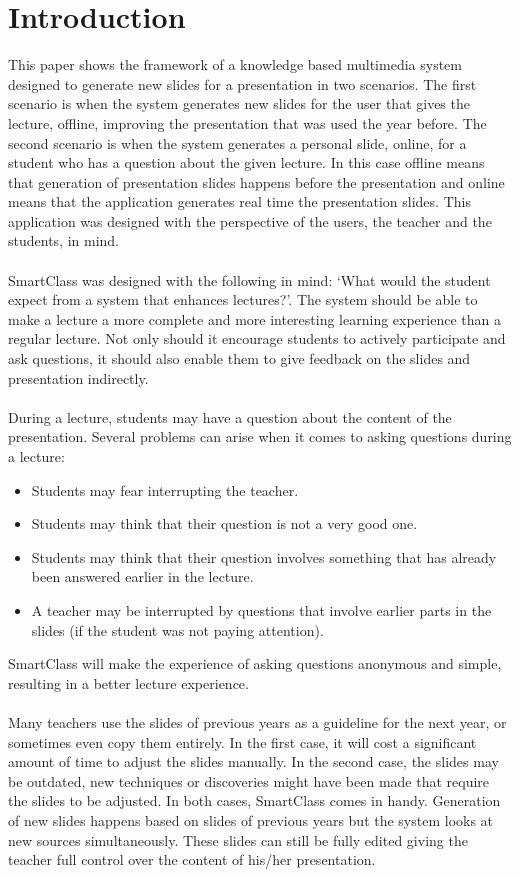 \documentclass[11pt]{article}
\begin{document}
\section{Introduction}
This paper shows the framework of a knowledge based multimedia system designed to generate new slides for a presentation in two scenarios. The first scenario is when the system generates new slides for the user that gives the lecture, offline, improving the presentation that was used the year before. The second scenario is when the system generates a personal slide, online, for a student who has a question about the given lecture. In this case offline means that generation of presentation slides happens before the presentation and online means that the application generates real time the presentation slides. This application was designed with the perspective of the users, the teacher and the students, in mind.\\\\
SmartClass was designed with the following in mind: `What would the student expect from a system that enhances lectures?'. The system should be able to make a lecture a more complete and more interesting learning experience than a regular lecture. Not only should it encourage students to actively participate and ask questions, it should also enable them to give feedback on the slides and presentation indirectly. \\\\
During a lecture, students may have a question about the content of the presentation. Several problems can arise when it comes to asking questions during a lecture:
\begin{itemize}
\item Students may fear interrupting the teacher.
\item Students may think that their question is not a very good one.
\item Students may think that their question involves something that has already been answered earlier in the lecture. 
\item A teacher may be interrupted by questions that involve earlier parts in the slides (if the student was not paying attention).
\end{itemize}

SmartClass will make the experience of asking questions anonymous and simple, resulting in a better lecture experience.\\\\
Many teachers use the slides of previous years as a guideline for the next year, or sometimes even copy them entirely. In the first case, it will cost a significant amount of time to adjust the slides manually. In the second case, the slides may be outdated, new techniques or discoveries might have been made that require the slides to be adjusted. In both cases, SmartClass comes in handy.  Generation of new slides happens based on slides of previous years but the system looks at new sources simultaneously. These slides can still be fully edited giving the teacher full control over the content of his/her presentation. \\\\
\end{document}
